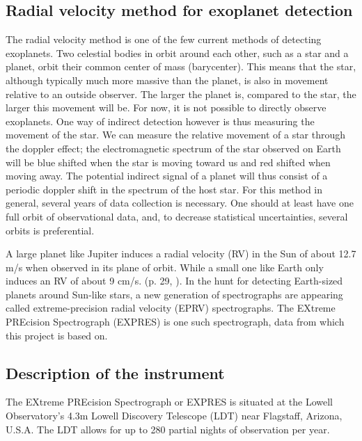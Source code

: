 \subsection{Radial velocity method for exoplanet detection}
The radial velocity method is one of the few current methods of detecting exoplanets. Two celestial bodies in orbit around each other, such as a star and a planet, orbit their common center of mass (barycenter). This means that the star, although typically much more massive than the planet, is also in movement relative to an outside observer. The larger the planet is, compared to the star, the larger this movement will be. For now, it is not possible to directly observe exoplanets. One way of indirect detection however is thus measuring the movement of the star. We can measure the relative movement of a star through the doppler effect; the electromagnetic spectrum of the star observed on Earth will be blue shifted when the star is moving toward us and red shifted when moving away. The potential indirect signal of a planet will thus consist of a periodic doppler shift in the spectrum of the host star. For this method in general, several years of data collection is necessary. One should at least have one full orbit of observational data, and, to decrease statistical uncertainties, several orbits is preferential.

A large planet like Jupiter induces a radial velocity (RV) in the Sun of about 12.7 m/s when observed in its plane of orbit. While a small one like Earth only induces an RV of about 9 cm/s. (p. 29, \cite{radial_velocity_techniques}). In the hunt for detecting Earth-sized planets around Sun-like stars, a new generation of spectrographs are appearing called extreme-precision radial velocity (EPRV) spectrographs. The EXtreme PREcision Spectrograph (EXPRES) is one such spectrograph, data from which this project is based on. 

\vspace{0.5cm}

\subsection{Description of the instrument}
The EXtreme PREcision Spectrograph or EXPRES is situated at the Lowell Observatory's 4.3m Lowell Discovery Telescope (LDT) near Flagstaff, Arizona, U.S.A. The LDT allows for up to 280 partial nights of observation per year. 

